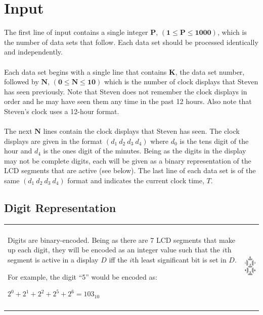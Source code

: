 \documentclass[a4paper,11pt,oneside]{article}
\begin{document}
\section{Input}
The first line of input contains a single integer $\boldsymbol{P}$,
$(\boldsymbol{1} \le \boldsymbol{P} \le \boldsymbol{1000})$, which is the
number of data sets that follow. Each data set should be processed identically
and independently.
\\\\
Each data set begins with a single line that contains $\boldsymbol{K}$, the data
set number, followed by $\boldsymbol{N}$,
$(\boldsymbol{0} \le \boldsymbol{N} \le \boldsymbol{10})$ which is the number
of clock displays that Steven has seen previously. Note that Steven does not
remember the clock displays in order and he may have seen them any time in the past
12 hours. Also note that Steven's clock uses a 12-hour format.
\\\\
The next $\boldsymbol{N}$ lines  contain the clock displays that Steven has seen.
The clock displays are given in the format $(d_1\ d_2\ d_3\ d_4)$ where $d_0$ is
the tens digit of the hour and $d_4$ is the ones digit of the minutes. Being as
the digits in the display may not be complete digits, each will be given as
a binary representation of the LCD segments that are active (see below). The last
line of each data set is of the same $(d_1\ d_2\ d_3\ d_4)$ format and indicates
the current clock time, $T$.

\subsection{Digit Representation}
\begin{tabularx}{\textwidth}{X r}
\parbox[m]{10cm}{Digits are binary-encoded. Being as there are 7 LCD segments that
make up each digit, they will be encoded as an integer value such that the $i$th segment
is active in a display $D$ iff the $i$th least significant bit is set in $D$.
\\\\
For example, the digit ``5'' would be encoded as:
\begin{center}
$2^0 + 2^1 + 2^2 + 2^5 + 2^6 = 103_{10}$
\end{center}
} & \parbox[m]{5cm}{\includegraphics[height=120pt]{./assets/digit_binary.eps}} \\
\end{tabularx}
\end{document}
